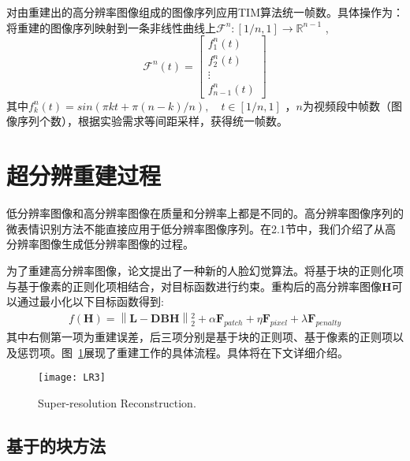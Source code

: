 对由重建出的高分辨率图像组成的图像序列应用TIM算法统一帧数。具体操作为：将重建的图像序列映射到一条非线性曲线上$\mathcal{F}^{n}:\left [ 1/n,1 \right ]\rightarrow \mathbb{R}^{n-1}$ ,
\begin{equation}
    \label{eq4}
    \mathcal{F}^{n}(t)=\begin{bmatrix}f_{1}^{n}(t)\\ f_{2}^{n}(t)\\ \vdots \\ f_{n-1}^{n}(t)\end{bmatrix}
\end{equation}
其中$f_{k}^{n}(t)=sin(\pi kt+\pi (n-k)/n),\quad t\in \left [ 1/n,1 \right ]$ ，$n$为视频段中帧数（图像序列个数），根据实验需求等间距采样，获得统一帧数。

\section{超分辨重建过程}

低分辨率图像和高分辨率图像在质量和分辨率上都是不同的。高分辨率图像序列的微表情识别方法不能直接应用于低分辨率图像序列。在2.1节中，我们介绍了从高分辨率图像生成低分辨率图像的过程。

为了重建高分辨率图像，论文提出了一种新的人脸幻觉算法。将基于块的正则化项与基于像素的正则化项相结合，对目标函数进行约束。重构后的高分辨率图像$\boldsymbol{H}$可以通过最小化以下目标函数得到:
\begin{equation}
 \label{eq4}
 \begin{split}
    f\left ( \boldsymbol{H} \right )= \left \| \boldsymbol{L}-\boldsymbol{DBH} \right \|{_{2}^{2}}+\alpha \boldsymbol{F}_{patch}+\eta \boldsymbol{F}_{pixel}+\lambda \boldsymbol{F}_{penalty}
 \end{split}
\end{equation}
其中右侧第一项为重建误差，后三项分别是基于块的正则项、基于像素的正则项以及惩罚项。图~\ref{fig15}展现了重建工作的具体流程。具体将在下文详细介绍。

\begin{figure}[!htbp]
\centering
\texttt{[image: LR3]}
\caption{Super-resolution Reconstruction.}
\label{fig15}
\end{figure}

\subsection{基于的块方法}

